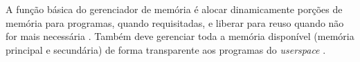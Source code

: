 
A função básica do gerenciador de memória é alocar dinamicamente porções
de memória para programas, quando requisitadas, e liberar para reuso 
quando não for mais necessária \cite{IBMMemoryManagement}.  Também deve
gerenciar toda a memória disponível (memória principal e secundária) de 
forma transparente aos programas do \textsl{userspace} 
\cite{TheLinuxKernel}.

